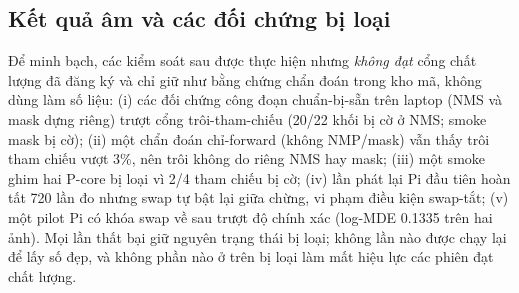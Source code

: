 \subsection{Kết quả âm và các đối chứng bị loại}
Để minh bạch, các kiểm soát sau được thực hiện nhưng \emph{không đạt} cổng chất lượng đã đăng ký và chỉ giữ như bằng chứng chẩn đoán trong kho mã, không dùng làm số liệu: (i) các đối chứng công đoạn chuẩn-bị-sẵn trên laptop (NMS và mask dựng riêng) trượt cổng trôi-tham-chiếu (20/22 khối bị cờ ở NMS; smoke mask bị cờ); (ii) một chẩn đoán chỉ-forward (không NMP/mask) vẫn thấy trôi tham chiếu vượt 3\%, nên trôi không do riêng NMS hay mask; (iii) một smoke ghim hai P-core bị loại vì 2/4 tham chiếu bị cờ; (iv) lần phát lại Pi đầu tiên hoàn tất 720 lần đo nhưng swap tự bật lại giữa chừng, vi phạm điều kiện swap-tắt; (v) một pilot Pi có khóa swap về sau trượt độ chính xác (log-MDE 0.1335 trên hai ảnh). Mọi lần thất bại giữ nguyên trạng thái bị loại; không lần nào được chạy lại để lấy số đẹp, và không phần nào ở trên bị loại làm mất hiệu lực các phiên đạt chất lượng.
